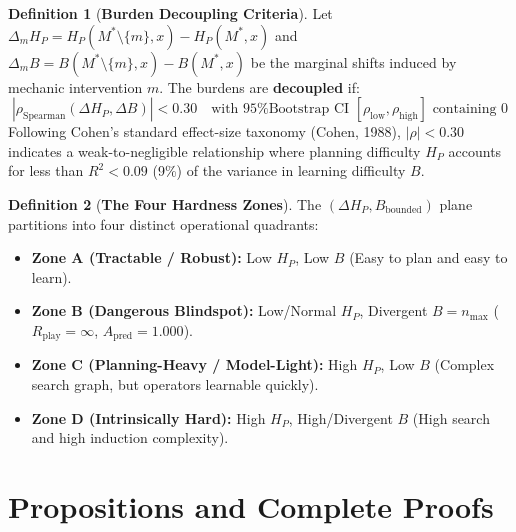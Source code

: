 \documentclass[11pt,a4paper]{article}
\theoremstyle{definition}
\newtheorem{definition}{Definition}
\begin{document}
\begin{definition}[\textbf{Burden Decoupling Criteria}]
Let $\Delta_m H_P = H_P(M^* \setminus \{m\}, x) - H_P(M^*, x)$ and $\Delta_m B = B(M^* \setminus \{m\}, x) - B(M^*, x)$ be the marginal shifts induced by mechanic intervention $m$. The burdens are \textbf{decoupled} if:
\begin{equation}
|\rho_{\text{Spearman}}(\Delta H_P, \Delta B)| < 0.30 \quad \text{with 95\% Bootstrap CI } [\rho_{\text{low}}, \rho_{\text{high}}] \text{ containing } 0
\end{equation}
Following Cohen's standard effect-size taxonomy (Cohen, 1988), $|\rho| < 0.30$ indicates a weak-to-negligible relationship where planning difficulty $H_P$ accounts for less than $R^2 < 0.09$ (9\%) of the variance in learning difficulty $B$.
\end{definition}

\begin{definition}[\textbf{The Four Hardness Zones}]
The $(\Delta H_P, B_{\text{bounded}})$ plane partitions into four distinct operational quadrants:
\begin{itemize}
    \item \textbf{Zone A (Tractable / Robust):} Low $H_P$, Low $B$ (Easy to plan and easy to learn).
    \item \textbf{Zone B (Dangerous Blindspot):} Low/Normal $H_P$, Divergent $B = n_{\max}$ ($R_{\text{play}} = \infty$, $A_{\text{pred}} = 1.000$).
    \item \textbf{Zone C (Planning-Heavy / Model-Light):} High $H_P$, Low $B$ (Complex search graph, but operators learnable quickly).
    \item \textbf{Zone D (Intrinsically Hard):} High $H_P$, High/Divergent $B$ (High search and high induction complexity).
\end{itemize}
\end{definition}

\section{Propositions and Complete Proofs}
\end{document}
